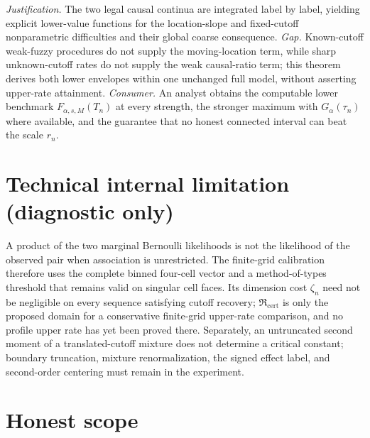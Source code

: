 \documentclass{article}
\begin{document}
\par\smallskip\noindent \textit{Justification.} The two legal causal continua are integrated label by label, yielding explicit lower-value functions for the location-slope and fixed-cutoff nonparametric difficulties and their global coarse consequence. \textit{Gap.} Known-cutoff weak-fuzzy procedures do not supply the moving-location term, while sharp unknown-cutoff rates do not supply the weak causal-ratio term; this theorem derives both lower envelopes within one unchanged full model, without asserting upper-rate attainment. \textit{Consumer.} An analyst obtains the computable lower benchmark \(F_{\alpha,s,M}(T_n)\) at every strength, the stronger maximum with \(G_\alpha(\tau_n)\) where available, and the guarantee that no honest connected interval can beat the scale \(r_n\).

\section*{Technical internal limitation (diagnostic only)}

A product of the two marginal Bernoulli likelihoods is not the likelihood of the observed pair when association is unrestricted. The finite-grid calibration therefore uses the complete binned four-cell vector and a method-of-types threshold that remains valid on singular cell faces. Its dimension cost \(\zeta_n\) need not be negligible on every sequence satisfying cutoff recovery; \(\mathfrak R_{\mathrm{cert}}\) is only the proposed domain for a conservative finite-grid upper-rate comparison, and no profile upper rate has yet been proved there. Separately, an untruncated second moment of a translated-cutoff mixture does not determine a critical constant; boundary truncation, mixture renormalization, the signed effect label, and second-order centering must remain in the experiment.

\section{Honest scope}
\end{document}
